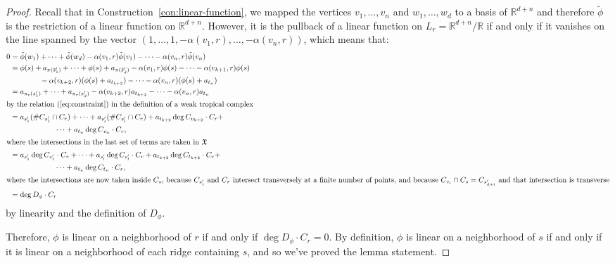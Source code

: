 \documentclass[11pt,reqno]{amsart}
\theoremstyle{definition}
\newcommand{\RR}{\mathbb R}
\newcommand{\X}{\mathfrak X}
\begin{document}
\begin{proof}
Recall that in
Construction~\ref{con:linear-function}, we mapped the vertices $v_1, \ldots,
v_n$ and $w_1, \ldots, w_d$ to a basis of $\RR^{d+n}$ and therefore $\tilde \phi$ is
the restriction of a linear function on $\RR^{d+n}$. However, it is the pullback
of a linear function on $L_r = \RR^{d+n}/\RR$ if and only if it vanishes on the
line
spanned by the vector $(1, \ldots, 1, -\alpha(v_1, r), \ldots, -\alpha(v_n,r))$,
which means that:
\begin{align*}
0 &= \tilde\phi(w_1) + \cdots + \tilde\phi(w_d) - \alpha(v_1, r) \tilde\phi(v_1) -
\cdots - \alpha(v_n, r) \tilde \phi(v_n) \\
&= \phi(s) + a_{\pi(\tilde s_1')} + \cdots + \phi(s) + a_{\pi(\tilde s_d')}
- \alpha(v_1,r) \phi(s) - \cdots - \alpha(v_{k+1},r) \phi(s) \\
&\qquad\qquad - \alpha(v_{k+2},r)
(\phi(s) + a_{t_{k+2}}) - \cdots - \alpha(v_{n},r) (\phi(s) + a_{t_n}) \\
&= a_{\pi_r(s_1')} + \cdots + a_{\pi_r(s_d')} - \alpha(v_{k+2}, r) a_{t_{k+2}} - \cdots -
\alpha(v_n, r) a_{t_{n}} \\
\intertext{by the relation (\ref{eq:constraint}) in the definition of a weak tropical
complex}
&= a_{s_1'} (\# C_{s_1'} \cap C_r) + \cdots + a_{s_l'} (\# C_{s_l'} \cap C_r)
+ a_{t_{k+2}} \deg C_{v_{k+2}} \cdot C_r + \\
&\qquad\qquad\qquad \cdots + a_{t_{n}} \deg C_{v_n} \cdot C_r, \\
\intertext{where the intersections in the last set of terms are taken in $\X$}
&= a_{s_1'} \deg C_{s_1'} \cdot C_r  + \cdots + a_{s_l'} \deg C_{s_l'} \cdot C_r
+ a_{t_{k+2}} \deg C_{t_{k+2}} \cdot C_r + \\
&\qquad\qquad\qquad \cdots + a_{t_{n}} \deg C_{t_{n}} \cdot C_r, \\
\intertext{where the intersections are now taken inside $C_s$, because
$C_{s_i'}$ and $C_r$ intersect transversely at a finite number of points, and
because $C_{v_i} \cap C_s = C_{s_{d+i}'}$ and that intersection is transverse}
&= \deg D_\phi \cdot C_r
\end{align*}
by linearity and the definition of $D_\phi$.

Therefore, $\phi$ is linear on a neighborhood of $r$ if and only if $\deg D_\phi
\cdot C_r = 0$. By definition, $\phi$ is linear on a neighborhood of $s$ if and
only if it is linear on a neighborhood of each ridge containing $s$, and so
we've proved the lemma statement.
\end{proof}
\end{document}
